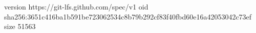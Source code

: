 version https://git-lfs.github.com/spec/v1
oid sha256:3651c416ba1b591be723062534c8b79b292cf83f40fbd60e16a42053042c73ef
size 51563
